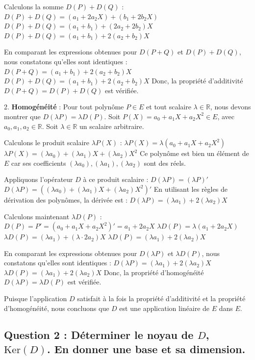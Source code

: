 \documentclass{report}
\begin{document}
    Calculons la somme $D(P) + D(Q)$ :
    $D(P) + D(Q) = (a_1 + 2a_2 X) + (b_1 + 2b_2 X)$
    $D(P) + D(Q) = (a_1+b_1) + (2a_2+2b_2)X$
    $D(P) + D(Q) = (a_1+b_1) + 2(a_2+b_2)X$

    En comparant les expressions obtenues pour $D(P+Q)$ et $D(P)+D(Q)$, nous constatons qu'elles sont identiques :
    $D(P+Q) = (a_1+b_1) + 2(a_2+b_2)X$
    $D(P) + D(Q) = (a_1+b_1) + 2(a_2+b_2)X$
    Donc, la propriété d'additivité $D(P+Q) = D(P) + D(Q)$ est vérifiée.

2.  \textbf{Homogénéité} : Pour tout polynôme $P \in E$ et tout scalaire $\lambda \in \mathbb{R}$, nous devons montrer que $D(\lambda P) = \lambda D(P)$.
    Soit $P(X) = a_0 + a_1 X + a_2 X^2 \in E$, avec $a_0, a_1, a_2 \in \mathbb{R}$.
    Soit $\lambda \in \mathbb{R}$ un scalaire arbitraire.

    Calculons le produit scalaire $\lambda P(X)$ :
    $\lambda P(X) = \lambda (a_0 + a_1 X + a_2 X^2)$
    $\lambda P(X) = (\lambda a_0) + (\lambda a_1)X + (\lambda a_2)X^2$
    Ce polynôme est bien un élément de $E$ car ses coefficients $(\lambda a_0), (\lambda a_1), (\lambda a_2)$ sont des réels.

    Appliquons l'opérateur $D$ à ce produit scalaire :
    $D(\lambda P) = (\lambda P)'$
    $D(\lambda P) = ((\lambda a_0) + (\lambda a_1)X + (\lambda a_2)X^2)'$
    En utilisant les règles de dérivation des polynômes, la dérivée est :
    $D(\lambda P) = (\lambda a_1) + 2(\lambda a_2)X$

    Calculons maintenant $\lambda D(P)$ :
    $D(P) = P' = (a_0 + a_1 X + a_2 X^2)' = a_1 + 2a_2 X$
    $\lambda D(P) = \lambda (a_1 + 2a_2 X)$
    $\lambda D(P) = (\lambda a_1) + (\lambda \cdot 2a_2)X$
    $\lambda D(P) = (\lambda a_1) + 2(\lambda a_2)X$

    En comparant les expressions obtenues pour $D(\lambda P)$ et $\lambda D(P)$, nous constatons qu'elles sont identiques :
    $D(\lambda P) = (\lambda a_1) + 2(\lambda a_2)X$
    $\lambda D(P) = (\lambda a_1) + 2(\lambda a_2)X$
    Donc, la propriété d'homogénéité $D(\lambda P) = \lambda D(P)$ est vérifiée.

Puisque l'application $D$ satisfait à la fois la propriété d'additivité et la propriété d'homogénéité, nous concluons que $D$ est une application linéaire de $E$ dans $E$.

\subsection*{Question 2 : Déterminer le noyau de $D$, $\text{Ker}(D)$. En donner une base et sa dimension.}
\end{document}
